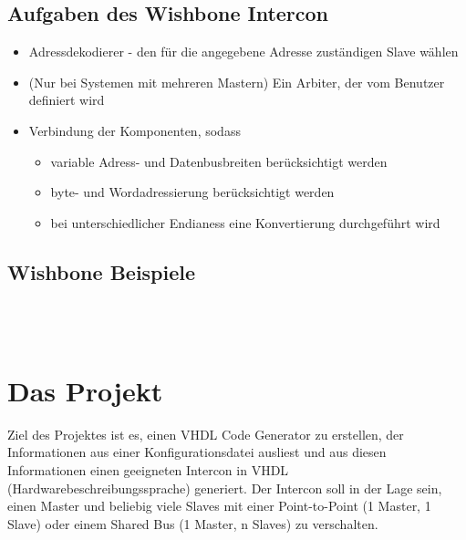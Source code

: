 \documentclass{article}
\begin{document}
\subsection{Aufgaben des Wishbone Intercon}
\begin{itemize}
\item Adressdekodierer - den für die angegebene Adresse zuständigen Slave wählen
\item (Nur bei Systemen mit mehreren Mastern) Ein Arbiter, der vom Benutzer definiert wird
\item Verbindung der Komponenten, sodass
\begin{itemize}
\item variable Adress- und Datenbusbreiten berücksichtigt werden
\item byte- und Wordadressierung berücksichtigt werden
\item bei unterschiedlicher Endianess eine Konvertierung durchgeführt wird
\end{itemize}
\end{itemize}
\subsection{Wishbone Beispiele}

\noindent
{}
\\\\
\noindent
{}

\section{Das Projekt}
Ziel des Projektes ist es, einen VHDL Code Generator zu erstellen,
der Informationen aus einer Konfigurationsdatei ausliest und aus
diesen Informationen einen geeigneten Intercon in VHDL (Hardwarebeschreibungssprache) generiert.
Der Intercon soll in der Lage sein, einen Master und beliebig viele Slaves mit einer \glqq Point-to-Point \grqq
(1 Master, 1 Slave) oder einem \glqq Shared Bus \grqq (1 Master, n Slaves) zu verschalten.
\end{document}
